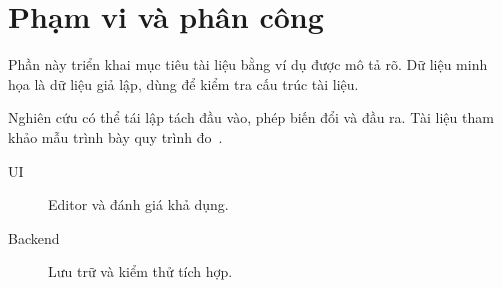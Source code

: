 \chapter{Phạm vi và phân công}


\label{sec:chapter1}
Phần này triển khai mục tiêu tài liệu bằng ví dụ được mô tả rõ. Dữ liệu minh họa là dữ liệu giả lập, dùng để kiểm tra cấu trúc tài liệu.

Nghiên cứu có thể tái lập tách đầu vào, phép biến đổi và đầu ra. Tài liệu tham khảo mẫu trình bày quy trình đo~\cite{example}.
\begin{description}
\item[UI] Editor và đánh giá khả dụng.
\item[Backend] Lưu trữ và kiểm thử tích hợp.
\end{description}
